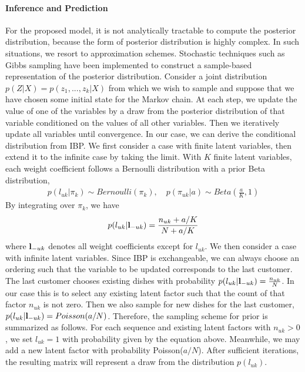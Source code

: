 \documentclass[11pt]{proposalnsf}
\newlength\q %
\begin{document}
\begin{sloppypar}
\vspace{-3mm}\paragraph{Inference and Prediction} For the proposed model, it is not analytically tractable to compute the posterior distribution, because the form of posterior distribution is highly complex. In such situations, we resort to approximation schemes. Stochastic techniques such as Gibbs sampling have been implemented to construct a sample-based representation of the posterior distribution. Consider a joint distribution $p(Z |X ) = p(z_1, ..., z_k|X)$ from which we wish to sample and suppose that we have chosen some initial state for the Markov chain. At each step, we update the value of one of the variables by a draw from the posterior distribution of that variable conditioned on the values of all other variables. Then we iteratively update all variables until convergence. In our case, we can derive the conditional distribution from IBP. We first consider a case with finite latent variables, then extend it to the infinite case by taking the limit. With $K$ finite latent variables, each weight coefficient follows a Bernoulli distribution with a prior Beta distribution,
\begin{align}
p(l_{uk}|\pi_k) \sim Bernoulli(\pi_k), \quad p(\pi_{uk}|a) \sim Beta(\frac{a}{K}, 1)
\end{align}
By integrating over $\pi_k$, we have 
\begin{align}
p(l_{uk}|{\bf l}_{-uk}) = \frac{n_{uk}+a/K}{N+ a/K}
\end{align}
where ${\bf l}_{-uk}$ denotes all weight coefficients except for $l_{uk}$. We then consider a case with infinite latent variables. Since IBP is exchangeable, we can always choose an ordering such that the variable to be updated corresponds to the last customer. The last customer chooses existing dishes with probability $p(l_{uk}|{\bf l}_{-uk}) = \frac{n_{uk}}{N}$.
In our case this is to select any existing latent factor such that the count of that factor $n_{uk}$ is not zero. Then we also sample for new dishes for the last customer, $p(l_{uk}|{\bf l}_{-uk}) = Poisson(a/N)$.
Therefore, the sampling scheme for prior is summarized as follows. For each sequence and existing latent factors with $n_{uk} > 0$, we set $l_{uk} = 1$ with probability given by the equation above. Meanwhile, we may add a new latent factor with probability Poisson($a/N$). After sufficient iterations, the resulting matrix will represent a draw from the distribution $p(l_{uk})$. 


\end{sloppypar}
\end{document}
